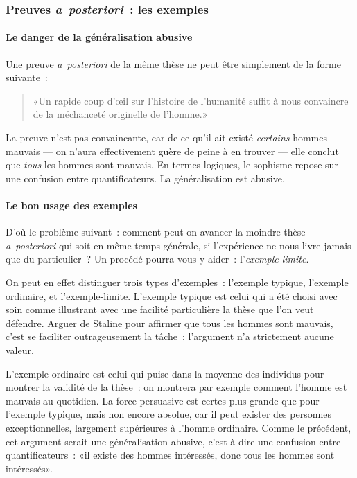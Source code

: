 \documentclass[a4paper,11pt]{article}
\newcommand{\cad}{c'est-à-dire}
\newcommand{\apost}{\emph{a~posteriori}}
\begin{document}
\par


\subsubsection{Preuves \apost{}~: les exemples}

\paragraph{Le danger de la généralisation abusive}

Une preuve \apost{} de la même thèse ne peut être simplement de la forme
suivante~: 
\begin{quote}
  «Un rapide coup d'œil sur l'histoire de l'humanité suffit à nous
  convaincre de la méchanceté originelle de l'homme.»
\end{quote}
La preuve n'est pas convaincante, car de ce qu'il ait existé
\emph{certains} hommes mauvais --- on n'aura effectivement guère de
peine à en trouver --- elle conclut que \emph{tous} les hommes sont
mauvais. En termes logiques, le sophisme repose sur une confusion entre
quantificateurs. La généralisation est abusive.

\par


\paragraph{Le bon usage des exemples}

D'où le problème suivant~: comment peut-on avancer la moindre thèse
\apost{} qui soit en même temps générale, si l'expérience ne nous livre
jamais que du particulier~? Un procédé pourra vous y aider~:
l'\emph{exemple-limite}.

\par

On peut en effet distinguer trois types d'exemples~: l'exemple typique,
l'exemple ordinaire, et l'exemple-limite. L'exemple typique est celui
qui a été choisi avec soin comme illustrant avec une facilité
particulière la thèse que l'on veut défendre. Arguer de Staline pour
affirmer que tous les hommes sont mauvais, c'est se faciliter
outrageusement la tâche~; l'argument n'a strictement aucune valeur.

\par

L'exemple ordinaire est celui qui puise dans la moyenne des individus
pour montrer la validité de la thèse~: on montrera par exemple comment
l'homme est mauvais au quotidien. La force persuasive est certes plus
grande que pour l'exemple typique, mais non encore absolue, car il peut
exister des personnes exceptionnelles, largement supérieures à l'homme
ordinaire. Comme le précédent, cet argument serait une généralisation
abusive, \cad{} une confusion entre quantificateurs~: «il existe des
hommes intéressés, donc tous les hommes sont intéressés».
\end{document}
